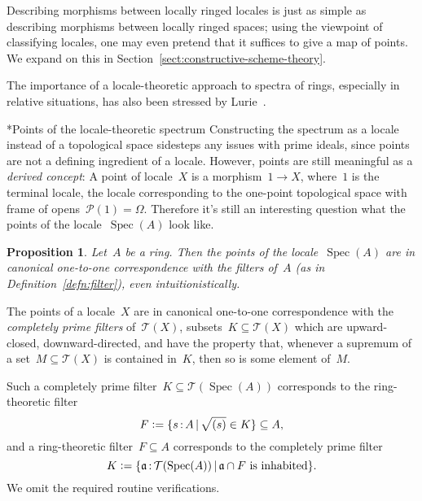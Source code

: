 \documentclass[10pt,reqno,a4paper]{amsbook}
\makeatletter
\theoremstyle{definition}
\theoremstyle{plain}
\newtheorem{prop}[defn]{Proposition}
\theoremstyle{remark}
\renewcommand{\P}{\mathcal{P}}
\newcommand{\T}{\mathcal{T}}
\newcommand{\aaa}{\mathfrak{a}}
\DeclareMathOperator{\Spec}{Spec}
\newcommand{\Open}{\T}
\newcommand{\?}{\,{:}\,}
\renewcommand{\_}{\mathpunct{.}\,}
\newcommand{\defeq}{\vcentcolon=}
\newcommand{\nocontentsline}[3]{}
\newcommand{\tocless}[1]{\let\addcontentsline=\nocontentsline}
\renewenvironment{proof}[1][\proofname]{\par
  \pushQED{\qed}%
  \normalfont \topsep6\p@\@plus6\p@\relax
  \trivlist
  \item[\hskip\labelsep
        \itshape
    #1\@addpunct{.}]\ignorespaces
}{%
  \popQED\endtrivlist\@endpefalse
}
\def\subsection{\@startsection{subsection}{2}%
  {0pt}{.5\linespacing\@plus.7\linespacing}{-.5em}%
  {\normalfont\bfseries}}
\makeatother
\begin{document}
Describing morphisms between locally ringed locales is just as simple as
describing morphisms between locally ringed spaces; using the viewpoint of
classifying locales, one may even pretend that it suffices to give a map of
points. We expand on this in Section~\ref{sect:constructive-scheme-theory}.

The importance of a locale-theoretic approach to spectra of rings, especially in
relative situations, has also been stressed by Lurie~\cite[p.~37]{lurie:dag5}.


{\tocless

\subsection*{Points of the locale-theoretic spectrum}
Constructing the spectrum as a locale instead of a topological space
sidesteps any issues with prime ideals, since points are not a defining
ingredient of a locale. However, points are still meaningful as a \emph{derived
concept}: A point of locale~$X$ is a morphism~$1 \to X$, where~$1$ is the
terminal locale, the locale corresponding to the one-point topological space
with frame of opens~$\P(1) = \Omega$.
Therefore it's still an interesting question what the points of the
locale~$\Spec(A)$ look like.

\begin{prop}\label{prop:points-spectrum}
Let~$A$ be a ring. Then the points of the locale~$\Spec(A)$ are in
canonical one-to-one correspondence with the filters of~$A$
(as in Definition~\ref{defn:filter}), even intuitionistically.\end{prop}

\begin{proof}The points of a locale~$X$ are in canonical one-to-one
correspondence with the \emph{completely prime filters} of~$\Open(X)$,
subsets~$K \subseteq \Open(X)$ which are upward-closed, downward-directed, and
have the property that, whenever a supremum of a set~$M \subseteq \Open(X)$ is
contained in~$K$, then so is some element of~$M$.

Such a completely prime filter~$K \subseteq \Open(\Spec(A))$ corresponds to the
ring-theoretic filter
\[ F \defeq \{ s \? A \,|\, \sqrt{(s)} \in K \} \subseteq A, \]
and a ring-theoretic filter~$F \subseteq A$ corresponds to the completely prime
filter
\[ K \defeq \{ \aaa \? \Open(\Spec(A)) \,|\,
  \text{$\aaa \cap F$ is inhabited} \}. \]
We omit the required routine verifications.
\end{proof}

}
\end{document}

